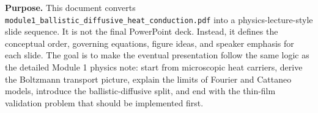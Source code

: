 \documentclass[11pt]{article}
\begin{document}

\begin{overviewbox}
\textbf{Purpose.} This document converts \texttt{module1\_ballistic\_diffusive\_heat\_conduction.pdf} into a physics-lecture-style slide sequence. It is not the final PowerPoint deck. Instead, it defines the conceptual order, governing equations, figure ideas, and speaker emphasis for each slide. The goal is to make the eventual presentation follow the same logic as the detailed Module 1 physics note: start from microscopic heat carriers, derive the Boltzmann transport picture, explain the limits of Fourier and Cattaneo models, introduce the ballistic-diffusive split, and end with the thin-film validation problem that should be implemented first.
\end{overviewbox}

\ProjectTOC
\end{document}

